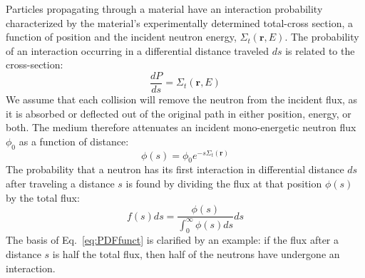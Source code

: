 Particles propagating through a material have an interaction
probability characterized by the material's experimentally determined
total-cross section, a function of position and the incident neutron
energy, $\Sigma_t(\mathbf{r}, E)$. The probability of an interaction
occurring in a differential distance traveled $ds$ is related to the
cross-section:
\begin{equation}
  \label{eq:macroscopic}
  \frac{dP}{ds} = \Sigma_t(\mathbf{r}, E)
\end{equation}
We assume that each collision will remove the neutron from the
incident flux, as it is absorbed or deflected out of the original path
in either position, energy, or both.  The medium therefore attenuates
an incident mono-energetic neutron flux $\phi_0$ as a function of
distance:
\begin{equation}
  \label{eq:attenuation}
  \phi(s) = \phi_0 e^{-s\Sigma_t(\mathbf{r})}
\end{equation}
The probability that a neutron has its first interaction in
differential distance $ds$ after
traveling a distance $s$ is found by dividing the flux at that
position $\phi(s)$ by the total flux:
\begin{equation}
  \label{eq:PDFfunct}
  f(s)ds = \frac{\phi(s)}{\int_0^\infty\phi(s)ds}ds
\end{equation}
The basis of Eq.~\eqref{eq:PDFfunct} is clarified by an example: if
the flux after a distance $s$ is half the total flux, then half of the
neutrons have undergone an interaction.

